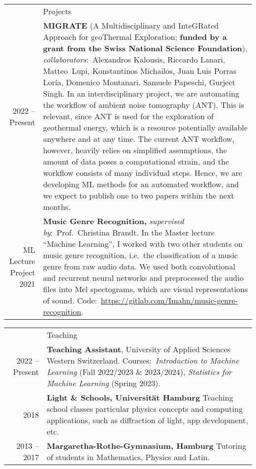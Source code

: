 \documentclass[11pt, a4paper]{article}
\newcommand{\headingfont}{\Large\color{OliveGreen}}
\newenvironment{SectionTable}[1]{
	\renewcommand*{\arraystretch}{1.7}
	\setlength{\tabcolsep}{10pt}
	\begin{longtable}{Rp{5.2in}} & #1 \\}
	{\end{longtable}\vspace{-.3cm}}
\begin{document}
	\begin{SectionTable}{\headingfont Projects}
		2022 -- Present & \textbf{MIGRATE} (A Multidisciplinary and InteGRated Approach for geoThermal Exploration; \textbf{funded by a grant from the Swiss National \mbox{Science} \mbox{Foundation}}), \textit{collaborators}:~Alexandros Kalousis, Riccardo Lanari, \mbox{Matteo Lupi}, \mbox{Konstantinos} Michailos, Juan Luis Porras Loría, Domenico \mbox{Montanari}, Samuele Papeschi, Gurjeet Singh. In an interdisciplinary project, we are automating the workflow of ambient noise tomography (ANT). This is relevant, since ANT is used for the exploration of geothermal energy, which is a resource potentially available anywhere and at any time. The current ANT workflow, however, heavily relies on simplified \mbox{assumptions}, the amount of data poses a computational strain, and the workflow consists of many individual steps. Hence, we are developing ML methods for an automated workflow, and we expect to publish one to two papers within the next months. \\
        
        ML Lecture Project 2021 & \textbf{Music Genre Recognition,} \textit{supervised by}:~Prof.~Christina Brandt. In the Master lecture \enquote{Machine Learning}, I worked with two other 
        students on music genre recognition, i.e.~the classification of a music genre from raw audio data. We used both convolutional and recurrent neural networks and preprocessed the audio files into 
        Mel spectograms, which are visual representations of sound. Code:~\url{https://gitlab.com/Imahn/music-genre-recognition}.
		
	\end{SectionTable}

	\begin{SectionTable}{\headingfont Teaching}
		2022 -- Present & \textbf{Teaching Assistant}, University of Applied Sciences Western Switzerland. \newline Courses:~\textit{Introduction to Machine Learning} (Fall 2022/2023 \& 2023/2024), \textit{Statistics for Machine Learning} (Spring 2023). \\
		
		2018 & 
		\textbf{Light \& Schools, Universität Hamburg} \newline
		Teaching school classes particular physics concepts and computing applications, such as diffraction of light, app development, etc.\\ 
		
		2013 -- 2017 & \textbf{Margaretha-Rothe-Gymnasium, Hamburg} \newline 
		Tutoring of students in Mathematics, Physics and Latin. 
	\end{SectionTable}
    
\end{document}
